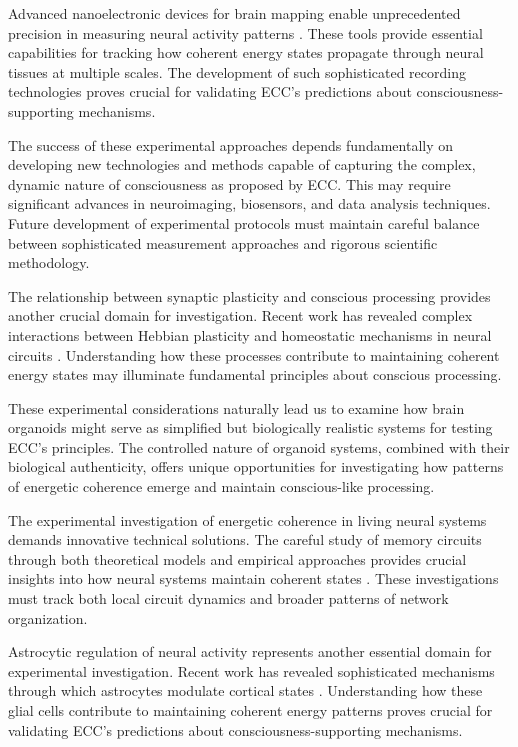 Advanced nanoelectronic devices for brain mapping enable unprecedented precision in measuring neural activity patterns \cite{Kuzum2014}. These tools provide essential capabilities for tracking how coherent energy states propagate through neural tissues at multiple scales. The development of such sophisticated recording technologies proves crucial for validating ECC's predictions about consciousness-supporting mechanisms.

The success of these experimental approaches depends fundamentally on developing new technologies and methods capable of capturing the complex, dynamic nature of consciousness as proposed by ECC. This may require significant advances in neuroimaging, biosensors, and data analysis techniques. Future development of experimental protocols must maintain careful balance between sophisticated measurement approaches and rigorous scientific methodology.

The relationship between synaptic plasticity and conscious processing provides another crucial domain for investigation. Recent work has revealed complex interactions between Hebbian plasticity and homeostatic mechanisms in neural circuits \cite{Turrigiano2017}. Understanding how these processes contribute to maintaining coherent energy states may illuminate fundamental principles about conscious processing.

These experimental considerations naturally lead us to examine how brain organoids might serve as simplified but biologically realistic systems for testing ECC's principles. The controlled nature of organoid systems, combined with their biological authenticity, offers unique opportunities for investigating how patterns of energetic coherence emerge and maintain conscious-like processing.

The experimental investigation of energetic coherence in living neural systems demands innovative technical solutions. The careful study of memory circuits through both theoretical models and empirical approaches provides crucial insights into how neural systems maintain coherent states \cite{Lisman2018}. These investigations must track both local circuit dynamics and broader patterns of network organization.

Astrocytic regulation of neural activity represents another essential domain for experimental investigation. Recent work has revealed sophisticated mechanisms through which astrocytes modulate cortical states \cite{Poskanzer2016}. Understanding how these glial cells contribute to maintaining coherent energy patterns proves crucial for validating ECC's predictions about consciousness-supporting mechanisms.

